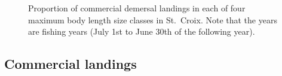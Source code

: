 \documentclass[
  letterpaper,
  oneside,
  open=any]{scrbook}
\begin{document}
\begin{figure}


\caption{\label{fig-STXLmax}Proportion of commercial demersal landings
in each of four maximum body length size classes in St.~Croix. Note that
the years are fishing years (July 1st to June 30th of the following
year).}

\end{figure}%

\subsection{Commercial landings}\label{commercial-landings}
\end{document}
